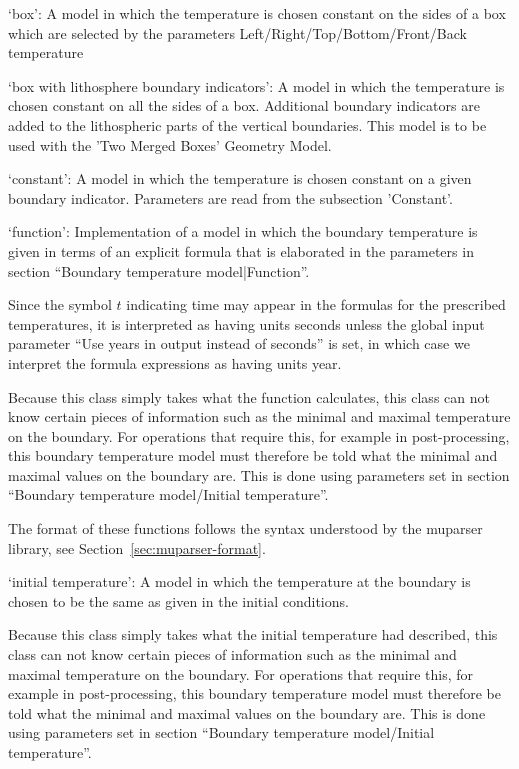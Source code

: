 \begin{itemize}
`box': A model in which the temperature is chosen constant on the sides of a box which are selected by the parameters Left/Right/Top/Bottom/Front/Back temperature

`box with lithosphere boundary indicators': A model in which the temperature is chosen constant on all the sides of a box. Additional boundary indicators are added to the lithospheric parts of the vertical boundaries. This model is to be used with the 'Two Merged Boxes' Geometry Model.

`constant': A model in which the temperature is chosen constant on a given boundary indicator.  Parameters are read from the subsection 'Constant'.

`function': Implementation of a model in which the boundary temperature is given in terms of an explicit formula that is elaborated in the parameters in section ``Boundary temperature model|Function''. 

Since the symbol $t$ indicating time may appear in the formulas for the prescribed temperatures, it is interpreted as having units seconds unless the global input parameter ``Use years in output instead of seconds'' is set, in which case we interpret the formula expressions as having units year.

Because this class simply takes what the function calculates, this class can not know certain pieces of information such as the minimal and maximal temperature on the boundary. For operations that require this, for example in post-processing, this boundary temperature model must therefore be told what the minimal and maximal values on the boundary are. This is done using parameters set in section ``Boundary temperature model/Initial temperature''.

The format of these functions follows the syntax understood by the muparser library, see Section~\ref{sec:muparser-format}.

`initial temperature': A model in which the temperature at the boundary is chosen to be the same as given in the initial conditions.

Because this class simply takes what the initial temperature had described, this class can not know certain pieces of information such as the minimal and maximal temperature on the boundary. For operations that require this, for example in post-processing, this boundary temperature model must therefore be told what the minimal and maximal values on the boundary are. This is done using parameters set in section ``Boundary temperature model/Initial temperature''.


\end{itemize}
